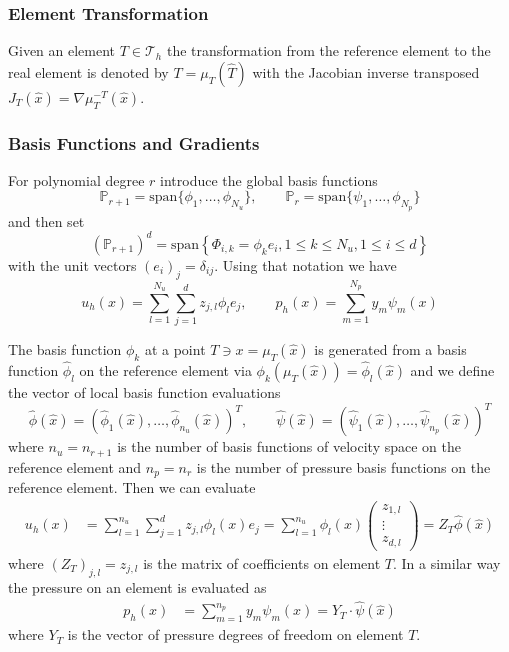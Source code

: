 \documentclass[a4paper,12pt]{article}
\theoremstyle{definition}
\begin{document}
\subsubsection*{Element Transformation}

Given an element $T\in\mathcal{T}_h$ the transformation from the reference element to the real element is denoted by $T = \mu_T(\hat T)$
with the Jacobian inverse transposed $J_T(\hat x) = \nabla\mu_T^{-T}(\hat x)$.

\subsubsection*{Basis Functions and Gradients} 

For polynomial degree $r$ introduce the global basis functions
\begin{equation}
\mathbb{P}_{r+1}=\text{span}\{ \phi_1,\ldots,\phi_{N_u}\}, \qquad 
\mathbb{P}_{r}=\text{span}\{ \psi_1,\ldots,\phi_{N_p}\}
\end{equation}
and then set
\begin{equation}
(\mathbb{P}_{r+1})^d = \text{span}\left\{ \Phi_{i,k} = \phi_k e_i, 1\leq k \leq N_u, 1\leq i \leq d    \right\}
\end{equation}
with the unit vectors $(e_i)_j=\delta_{ij}$. Using that notation we have
\begin{equation}
u_h(x) = \sum_{l=1}^{N_u} \sum_{j=1}^d z_{j,l} \phi_l e_j, \qquad p_h(x) = \sum_{m=1}^{N_p} y_{m}\psi_m(x)
\end{equation}

The basis function $\phi_k$ at a point $T\ni x = \mu_{T}(\hat x)$
is generated from a basis function $\hat\phi_l$ on the reference element via $\phi_k(\mu_T(\hat x)) = \hat\phi_l(\hat x)$ 
and we define the vector of local basis function evaluations
$$ \hat \phi(\hat x) = \left( \hat\phi_1(\hat x),\ldots,\hat\phi_{n_u}(\hat x) \right)^T, \qquad
\hat\psi(\hat x) =  \left( \hat\psi_1(\hat x),\ldots,\hat\psi_{n_p}(\hat x) \right)^T$$
where $n_u=n_{r+1}$ is the number of basis functions of velocity space on the reference element and
$n_p=n_r$ is the number of pressure basis functions on the reference element.
Then we can evaluate
\begin{equation}
\label{eq:evalu}
\begin{split}
u_h(x) &=  \sum_{l=1}^{n_u} \sum_{j=1}^d z_{j,l}   \phi_l(x) e_j  = \sum_{l=1}^{n_u} \phi_l(x) \left(\begin{array}{c}
z_{1,l}\\ \vdots\\ z_{d,l} \end{array}\right)
= Z_T \hat\phi(\hat x)
\end{split}
\end{equation}
where $(Z_T)_{j,l} = z_{j,l}$ is the matrix of coefficients on element $T$.
In a similar way the pressure on an element is evaluated as
\begin{equation}
\label{eq:evalp}
\begin{split}
p_h(x) &=  \sum_{m=1}^{n_p} y_{m} \psi_m(x) 
= Y_T \cdot \hat\psi(\hat x)
\end{split}
\end{equation}
where $Y_T$ is the vector of pressure degrees of freedom on element $T$.
\end{document}
